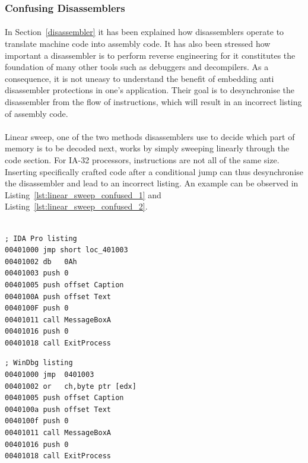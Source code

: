 \subsubsection{Confusing Disassemblers}
\paragraph{}
In Section~\ref{disassembler} it has been explained how disassemblers operate to translate machine code into assembly code. It has also been stressed how important a disassembler is to perform reverse engineering for it constitutes the foundation of many other tools such as debuggers and decompilers. As a consequence, it is not uneasy to understand the benefit of embedding anti disassembler protections in one's application. Their goal is to desynchronise the disassembler from the flow of instructions, which will result in an incorrect listing of assembly code.

\paragraph{}
Linear sweep, one of the two methods disassemblers use to decide which part of memory is to be decoded next, works by simply sweeping linearly through the code section. For IA-32 processors, instructions are not all of the same size. Inserting specifically crafted code after a conditional jump can thus desynchronise the disassembler and lead to an incorrect listing. An example can be observed in Listing~\ref{lst:linear_sweep_confused_1} and Listing~\ref{lst:linear_sweep_confused_2}. \\ \\

\noindent\begin{minipage}{.45\textwidth}
	\begin{lstlisting}[caption={The IDA Pro disassembler giving the correct output.}, label={lst:linear_sweep_confused_1}, frame=tlrb, language={[x86masm]Assembler}]
; IDA Pro listing
00401000 jmp short loc_401003
00401002 db   0Ah
00401003 push 0
00401005 push offset Caption
0040100A push offset Text
0040100F push 0
00401011 call MessageBoxA
00401016 push 0
00401018 call ExitProcess
	\end{lstlisting}
\end{minipage}\hfill
\begin{minipage}{.45\textwidth}
	\begin{lstlisting}[caption={The Microsoft WinDbg disassembler giving an incorrect output.}, label={lst:linear_sweep_confused_2}, frame=tlrb, language={[x86masm]Assembler}]
; WinDbg listing
00401000 jmp  0401003
00401002 or   ch,byte ptr [edx]
00401005 push offset Caption
0040100a push offset Text
0040100f push 0
00401011 call MessageBoxA
00401016 push 0
00401018 call ExitProcess
	\end{lstlisting}
\end{minipage}

